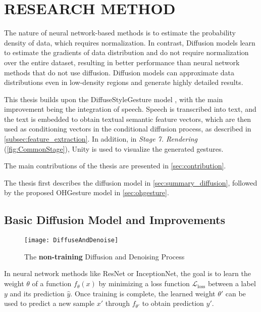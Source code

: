 \chapter{RESEARCH METHOD}
\label{chap:Chapter3}

The nature of neural network-based methods is to estimate the probability density of data, which requires normalization. In contrast, Diffusion models learn to estimate the gradients of data distribution \cite{song2021score} and do not require normalization over the entire dataset, resulting in better performance than neural network methods that do not use diffusion. Diffusion models can approximate data distributions even in low-density regions and generate highly detailed results.

This thesis builds upon the DiffuseStyleGesture model \cite{yang2022DiffuseStyleGestureplus}, with the main improvement being the integration of speech. Speech is transcribed into text, and the text is embedded to obtain textual semantic feature vectors, which are then used as conditioning vectors in the conditional diffusion process, as described in \autoref{subsec:feature_extraction}. In addition, in \textit{Stage 7. Rendering} (\autoref{fig:CommonStage}), Unity is used to visualize the generated gestures.

The main contributions of the thesis are presented in \autoref{sec:contribution}.

The thesis first describes the diffusion model in \autoref{sec:summary_diffusion}, followed by the proposed OHGesture model in \autoref{sec:ohgesture}.

\section{Basic Diffusion Model and Improvements}
\label{sec:summary_diffusion}

\begin{figure}[H]
	\centering
	\texttt{[image: DiffuseAndDenoise]}
	\caption{The \textbf{non-training} Diffusion and Denoising Process}
	\label{fig:DiffuseAndDenoise}
\end{figure}

In neural network methods like ResNet or InceptionNet, the goal is to learn the weight $\theta$ of a function $f_{\theta}(x)$ by minimizing a loss function $\mathcal{L}_\text{loss}$ between a label $y$ and its prediction $\hat{y}$. Once training is complete, the learned weight $\theta'$ can be used to predict a new sample $x'$ through $f_{\theta'}$ to obtain prediction $y'$.

